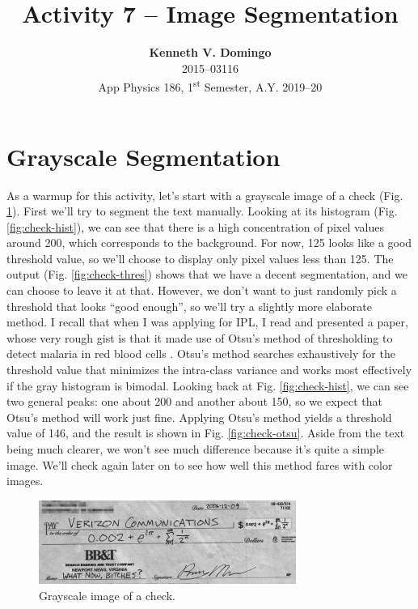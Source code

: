 \documentclass[12pt,a4paper]{article}
\newcommand{\activity}{Activity 7 -- Image Segmentation}
\begin{document}
\title{\TitleFont \activity}
\author[ ]{\textbf{Kenneth V. Domingo} \\
2015--03116 \\
App Physics 186, 1\textsuperscript{st} Semester, A.Y. 2019--20}

\maketitle
\thispagestyle{titlestyle}

\section*{Grayscale Segmentation}
As a warmup for this activity, let's start with a grayscale image of a check (Fig. \ref{fig:check}). First we'll try to segment the text manually. Looking at its histogram (Fig. \ref{fig:check-hist}), we can see that there is a high concentration of pixel values around 200, which corresponds to the background. For now, 125 looks like a good threshold value, so we'll choose to display only pixel values less than 125. The output (Fig. \ref{fig:check-thres}) shows that we have a decent segmentation, and we can choose to leave it at that. However, we don't want to just randomly pick a threshold that looks ``good enough'', so we'll try a slightly more elaborate method. I recall that when I was applying for IPL, I read and presented a paper, whose very rough gist is that it made use of Otsu's method of thresholding to detect malaria in red blood cells \cite{malaria}. Otsu's method searches exhaustively for the threshold value that minimizes the intra-class variance \cite{otsu} and works most effectively if the gray histogram is bimodal. Looking back at Fig. \ref{fig:check-hist}, we can see two general peaks: one about 200 and another about 150, so we expect that Otsu's method will work just fine. Applying Otsu's method yields a threshold value of 146, and the result is shown in Fig. \ref{fig:check-otsu}. Aside from the text being much clearer, we won't see much difference because it's quite a simple image. We'll check again later on to see how well this method fares with color images.

\begin{figure}[htb]
	\centering
	\includegraphics[width=0.75\textwidth]{grayscale_check.jpg}
	\caption{Grayscale image of a check.}
	\label{fig:check}
\end{figure}
\end{document}
